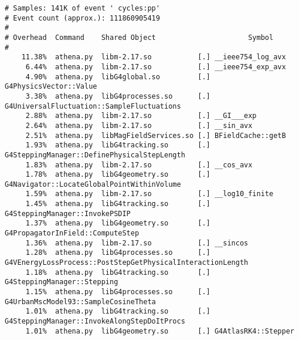\documentclass[a4paper]{jpconf}
\begin{document}
\begin{lstlisting}[caption=Recording of event 73 on core 8., label=event-73-processor8]
# Samples: 141K of event ' cycles:pp'
# Event count (approx.): 111860905419
#
# Overhead  Command    Shared Object                      Symbol
#
    11.38%  athena.py  libm-2.17.so           [.] __ieee754_log_avx
     6.44%  athena.py  libm-2.17.so           [.] __ieee754_exp_avx
     4.90%  athena.py  libG4global.so         [.] G4PhysicsVector::Value
     3.38%  athena.py  libG4processes.so      [.] G4UniversalFluctuation::SampleFluctuations
     2.88%  athena.py  libm-2.17.so           [.] __GI___exp
     2.64%  athena.py  libm-2.17.so           [.] __sin_avx
     2.51%  athena.py  libMagFieldServices.so [.] BFieldCache::getB
     1.93%  athena.py  libG4tracking.so       [.] G4SteppingManager::DefinePhysicalStepLength
     1.83%  athena.py  libm-2.17.so           [.] __cos_avx
     1.78%  athena.py  libG4geometry.so       [.] G4Navigator::LocateGlobalPointWithinVolume
     1.59%  athena.py  libm-2.17.so           [.] __log10_finite
     1.45%  athena.py  libG4tracking.so       [.] G4SteppingManager::InvokePSDIP
     1.37%  athena.py  libG4geometry.so       [.] G4PropagatorInField::ComputeStep
     1.36%  athena.py  libm-2.17.so           [.] __sincos
     1.28%  athena.py  libG4processes.so      [.] G4VEnergyLossProcess::PostStepGetPhysicalInteractionLength
     1.18%  athena.py  libG4tracking.so       [.] G4SteppingManager::Stepping
     1.15%  athena.py  libG4processes.so      [.] G4UrbanMscModel93::SampleCosineTheta
     1.01%  athena.py  libG4tracking.so       [.] G4SteppingManager::InvokeAlongStepDoItProcs
     1.01%  athena.py  libG4geometry.so       [.] G4AtlasRK4::Stepper

\end{lstlisting}

\end{document}
